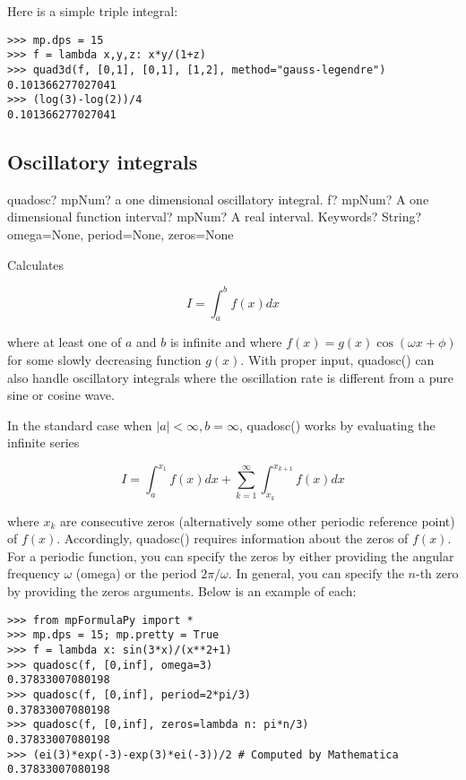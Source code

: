 \vpara
Here is a simple triple integral:

\begin{lstlisting}
>>> mp.dps = 15
>>> f = lambda x,y,z: x*y/(1+z)
>>> quad3d(f, [0,1], [0,1], [1,2], method="gauss-legendre")
0.101366277027041
>>> (log(3)-log(2))/4
0.101366277027041
\end{lstlisting}




\subsection{Oscillatory integrals}

\begin{mpFunctionsExtract}
	\mpFunctionThree
	{quadosc? mpNum? a one dimensional oscillatory integral.}
	{f? mpNum? A one dimensional function}
	{interval? mpNum? A real interval.}	
	{Keywords? String? omega=None, period=None, zeros=None}	
\end{mpFunctionsExtract}

\vpara
Calculates

\begin{equation}
I=\int_a^b f(x) dx
\end{equation}

where at least one of $a$ and $b$ is infinite and where $f(x) = g(x) \cos(\omega x + \phi)$ for some slowly decreasing function $g(x)$. With proper input, quadosc() can also handle oscillatory integrals where the oscillation rate is different from a pure sine or cosine wave.

\vpara
In the standard case when $|a|<\infty, b=\infty$, quadosc() works by evaluating the infinite series

\begin{equation}
I=\int_a^{x_1} f(x) dx + \sum_{k=1}^{\infty} \int_{x_k}^{x_{k+1}} f(x) dx
\end{equation}

where $x_k$ are consecutive zeros (alternatively some other periodic reference point) of $f(x)$. Accordingly, quadosc() requires information about the zeros of $f(x)$. For a periodic function, you can specify the zeros by either providing the angular frequency $\omega$ (omega) or the period $2\pi/\omega$. In general, you can specify the $n$-th zero by providing the zeros arguments. Below is an example of each:

\begin{lstlisting}
>>> from mpFormulaPy import *
>>> mp.dps = 15; mp.pretty = True
>>> f = lambda x: sin(3*x)/(x**2+1)
>>> quadosc(f, [0,inf], omega=3)
0.37833007080198
>>> quadosc(f, [0,inf], period=2*pi/3)
0.37833007080198
>>> quadosc(f, [0,inf], zeros=lambda n: pi*n/3)
0.37833007080198
>>> (ei(3)*exp(-3)-exp(3)*ei(-3))/2 # Computed by Mathematica
0.37833007080198
\end{lstlisting}

